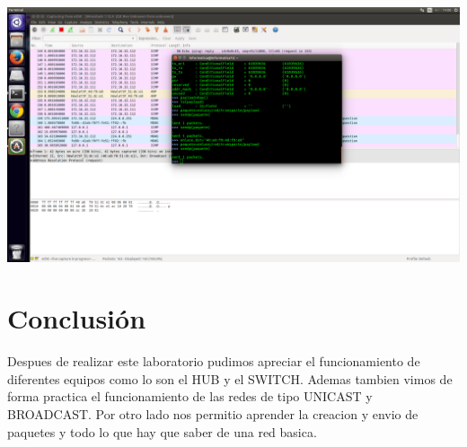 \documentclass[spanish]{udpreport}
\begin{document}
\includegraphics[scale=0.2]{fotos/8.png}


\chapter{Conclusión}
Despues de realizar este laboratorio pudimos apreciar el funcionamiento de diferentes equipos como lo son el HUB y el SWITCH. Ademas tambien vimos de forma practica el funcionamiento de las redes de tipo UNICAST y BROADCAST. Por otro lado nos permitio aprender la creacion y envio de paquetes y todo lo que hay que saber de una red basica.
\end{document}

